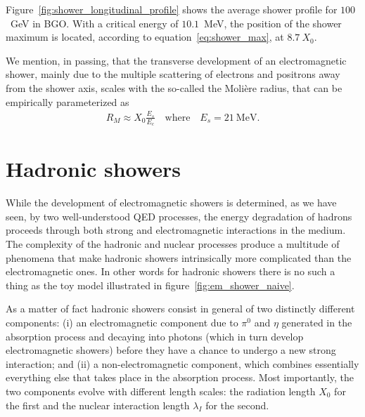Figure~\ref{fig:shower_longitudinal_profile} shows the average shower profile for
$100$~GeV in BGO. With a critical energy of $10.1$~MeV, the position of the shower
maximum is located, according to equation~\eqref{eq:shower_max}, at $8.7~X_0$.

We mention, in passing, that the transverse development of an electromagnetic
shower, mainly due to the multiple scattering of electrons and positrons away
from the shower axis, scales with the so-called the Moli\`ere radius, that can be
empirically parameterized as
\begin{align}
  R_M \approx X_0 \frac{E_s}{E_c}
  \quad\text{where}\quad
  E_s = 21~\text{MeV}.
\end{align}


\section{Hadronic showers}%
\label{sec:had_showers}

While the development of electromagnetic showers is determined, as we have seen,
by two well-understood QED processes, the energy degradation of hadrons proceeds
through both strong and electromagnetic interactions in the medium. The complexity
of the hadronic and nuclear processes produce a multitude of phenomena that make
hadronic showers intrinsically more complicated than the electromagnetic ones.
In other words for hadronic showers there is no such a thing as the toy model
illustrated in figure~\ref{fig:em_shower_naive}.

As a matter of fact hadronic showers consist in general of two distinctly different
components: (i) an electromagnetic component due to $\pi^0$ and $\eta$ generated
in the absorption process and decaying into photons (which in turn develop
electromagnetic showers) before they have a chance to undergo a new strong interaction;
and (ii) a non-electromagnetic component, which combines essentially everything
else that takes place in the absorption process. Most importantly, the two components
evolve with different length scales: the radiation length $X_0$ for the first and
the nuclear interaction length $\lambda_I$ for the second.

